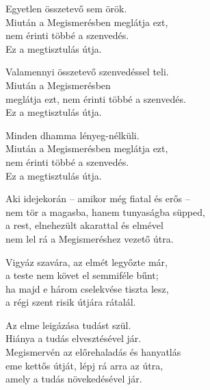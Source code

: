 \begin{dhpverse}

 Egyetlen összetevő sem örök.\\
Miután a Megismerésben meglátja ezt,\\
nem érinti többé a szenvedés.\\
Ez a megtisztulás útja.

 Valamennyi összetevő szenvedéssel teli.\\
Miután a Megismerésben\\
meglátja ezt, nem érinti többé a szenvedés.\\
Ez a megtisztulás útja.

 Minden dhamma lényeg-nélküli.\\
Miután a Megismerésben meglátja ezt,\\
nem érinti többé a szenvedés.\\
Ez a megtisztulás útja.

 Aki idejekorán – amikor még fiatal és erős –\\
nem tör a magasba, hanem tunyaságba süpped,\\
a rest, elnehezült akarattal és elmével\\
nem lel rá a Megismeréshez vezető útra.

 Vigyáz szavára, az elmét legyőzte már,\\
a teste nem követ el semmiféle bűnt;\\
ha majd e három cselekvése tiszta lesz,\\
a régi szent risik útjára rátalál.

 Az elme leigázása tudást szül.\\
Hiánya a tudás elvesztésével jár.\\
Megismervén az előrehaladás és hanyatlás\\
eme kettős útját, lépj rá arra az útra,\\
amely a tudás növekedésével jár.

\end{dhpverse}
\newpage

